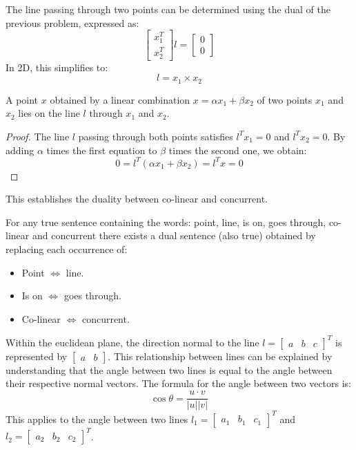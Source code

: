 \documentclass[12pt, a4paper]{report}
\begin{document}
    The line passing through two points can be determined using the dual of the previous problem, expressed as:
    \[\begin{bmatrix} x_1^T \\ x_2^T \end{bmatrix} l = \begin{bmatrix} 0 \\ 0 \end{bmatrix}\]
    In 2D, this simplifies to: 
    \[l=x_1 \times x_2\] 
    \begin{property}
        A point $x$ obtained by a linear combination $x=\alpha x_1+\beta x_2$ of two points $x_1$ and $x_2$ lies on the line $l$ through $x_1$ and $x_2$. 
    \end{property}
    \begin{proof}
        The line $l$ passing through both points satisfies  $l^Tx_1=0$ and  $l^Tx_2=0$. 
        By adding $\alpha$ times the first equation to $\beta$ times the second one, we obtain: 
        \[0=l^T\left( \alpha x_1+\beta x_2 \right)=l^Tx=0\]
    \end{proof}
    This establishes the duality between co-linear and concurrent.
    \begin{theorem}
        For any true sentence containing the words: point, line, is on, goes through, co-linear and concurrent there exists a dual sentence (also true) obtained by replacing each occurrence of:
        \begin{itemize}
            \item Point $\Leftrightarrow$ line. 
            \item Is on $\Leftrightarrow$ goes through.
            \item Co-linear $\Leftrightarrow$ concurrent. 
        \end{itemize}
    \end{theorem}
    Within the euclidean plane, the direction normal to the line $l={\begin{bmatrix} a & b & c \end{bmatrix}}^T$ is represented by $\begin{bmatrix} a & b \end{bmatrix}$. 
    This relationship between lines can be explained by understanding that the angle between two lines is equal to the angle between their respective normal vectors. 
    The formula for the angle between two vectors is:
    \[\cos\theta=\dfrac{u \cdot v}{\left\lvert u \right\rvert \left\lvert v \right\rvert}\] 
    This applies to the angle between two lines $l_1={\begin{bmatrix} a_1 & b_1 & c_1 \end{bmatrix}}^T$ and $l_2={\begin{bmatrix} a_2 & b_2 & c_2 \end{bmatrix}}^T$. 
\end{document}
